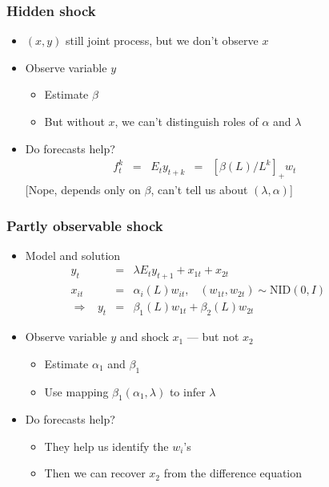 \documentclass{beamer}
\begin{document}
\begin{frame}
\frametitle{Hidden shock}
\begin{itemize}  \itemsep=\bigskipamount
\item $(x,y)$ still joint process, but we don't observe $x$
\item Observe variable $y$ \\
\begin{itemize}
\item Estimate $\beta$
\item But without $x$, we can't distinguish roles of $\alpha$ and $\lambda$
\end{itemize}
\item Do forecasts help?
\begin{eqnarray*}
    f^k_t \;\;=\;\; E_t y_{t+k} &=& \left[ \beta(L)/L^k\right]_+ w_t  \phantom{xxxx}
\end{eqnarray*}
\hspace{0.4in}[Nope, depends only on $\beta$, can't tell us about $(\lambda,\alpha)$]
\end{itemize}
\end{frame}

\begin{frame}
\frametitle{Partly observable shock}
\begin{itemize}  \itemsep=\bigskipamount
\item Model and solution
\begin{eqnarray*}
    y_t &=& \lambda E_t y_{t+1} + x_{1t} + x_{2t} \\
    x_{it} &=& \alpha_{i}(L) w_{it}, \;\;\; (w_{1t},w_{2t}) \sim \mbox{NID}(0,I)
                \phantom{xxxxxx} \\
    \Rightarrow \;\;\;
    y_t &=&  \beta_1(L) w_{1t} + \beta_2(L) w_{2t}
\end{eqnarray*}
\item Observe variable $y$ and shock $x_1$ --- but not $x_2$ \\
\begin{itemize}
\item Estimate $\alpha_{1}$ and $\beta_{1}$
\item Use mapping $\beta_1(\alpha_1,\lambda)$ to infer $\lambda$
\end{itemize}
\item Do forecasts help?  \\
\begin{itemize}
\item They help us identify the $w_i$'s
\item Then we can recover $x_2$ from the difference equation
\end{itemize}
\end{itemize}
\end{frame}
\end{document}
